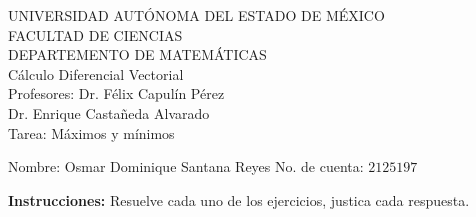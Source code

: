 \documentclass[fleqn, 12pt]{article}
\begin{document}
    \begin{center}
        UNIVERSIDAD AUTÓNOMA DEL ESTADO DE MÉXICO \\
        FACULTAD DE CIENCIAS \\
        DEPARTEMENTO DE MATEMÁTICAS \\
        Cálculo Diferencial Vectorial \\
        Profesores: Dr. Félix Capulín Pérez \\
        Dr. Enrique Castañeda Alvarado \\
        Tarea: Máximos y mínimos
    \end{center}

    Nombre: Osmar Dominique Santana Reyes \hfill No. de cuenta: $ 2125197 $

    \textbf{Instrucciones:} Resuelve cada uno de los ejercicios, justica cada respuesta.
\end{document}
